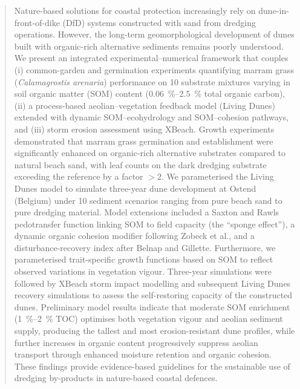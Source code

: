 \documentclass[authoryear,preprint,review,12pt]{elsarticle}
\begin{document}
\begin{frontmatter}
\begin{abstract}
Nature-based solutions for coastal protection increasingly rely on dune-in-front-of-dike (DfD) systems constructed with sand from dredging operations. However, the long-term geomorphological development of dunes built with organic-rich alternative sediments remains poorly understood. We present an integrated experimental--numerical framework that couples (i) common-garden and germination experiments quantifying marram grass (\textit{Calamagrostis arenaria}) performance on 10 substrate mixtures varying in soil organic matter (SOM) content (\SIrange{0.06}{2.5}{\percent} total organic carbon), (ii) a process-based aeolian--vegetation feedback model (Living Dunes) extended with dynamic SOM--ecohydrology and SOM--cohesion pathways, and (iii) storm erosion assessment using XBeach. Growth experiments demonstrated that marram grass germination and establishment were significantly enhanced on organic-rich alternative substrates compared to natural beach sand, with leaf counts on the dark dredging substrate exceeding the reference by a factor $>$2. We parameterised the Living Dunes model to simulate three-year dune development at Ostend (Belgium) under 10 sediment scenarios ranging from pure beach sand to pure dredging material. Model extensions included a Saxton and Rawls pedotransfer function linking SOM to field capacity (the ``sponge effect''), a dynamic organic cohesion modifier following Zobeck et al., and a disturbance-recovery index after Belnap and Gillette. Furthermore, we parameterised trait-specific growth functions based on SOM to reflect observed variations in vegetation vigour. Three-year simulations were followed by XBeach storm impact modelling and subsequent Living Dunes recovery simulations to assess the self-restoring capacity of the constructed dunes. Preliminary model results indicate that moderate SOM enrichment (\SIrange{1}{2}{\percent} TOC) optimises both vegetation vigour and aeolian sediment supply, producing the tallest and most erosion-resistant dune profiles, while further increases in organic content progressively suppress aeolian transport through enhanced moisture retention and organic cohesion. These findings provide evidence-based guidelines for the sustainable use of dredging by-products in nature-based coastal defences.

\end{abstract}


\end{frontmatter}
\end{document}
